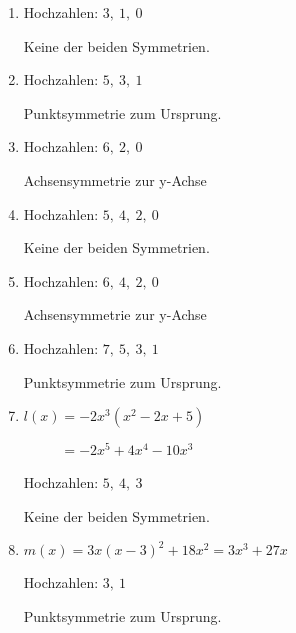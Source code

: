 \begin{Answer}[ref=ganzSymA1]
	
	\begin{minipage}{\textwidth}
		\begin{minipage}[t]{0.5\textwidth}
			\begin{enumerate}[label=\alph*)]
				\item Hochzahlen: \(3,\ 1,\ 0\)
				
				Keine der beiden Symmetrien.
				\item Hochzahlen: \(5,\ 3,\ 1\)
				
				Punktsymmetrie zum Ursprung.
				\item Hochzahlen: \(6,\ 2,\ 0\)
				
				Achsensymmetrie zur y-Achse
				\item Hochzahlen: \(5,\ 4,\ 2,\ 0\)
				
				Keine der beiden Symmetrien.
			\end{enumerate}
		\end{minipage}%
		\begin{minipage}[t]{0.5\textwidth}
			\begin{enumerate}[label=\alph*)]
				\setcounter{enumi}{4}
				\item Hochzahlen: \(6,\ 4,\ 2,\ 0\)
				
				Achsensymmetrie zur y-Achse
				\item Hochzahlen: \(7,\ 5,\ 3,\ 1\)
				
				Punktsymmetrie zum Ursprung.
				\item \(l(x)=-2x^3\left(x^2-2x+5\right)\)
				
				\(\phantom{l(x)}=-2x^5+4x^4-10x^3\)
				
				Hochzahlen: \(5,\ 4,\ 3\)
				
				Keine der beiden Symmetrien.
				\item \(m(x)=3x\left(x-3\right)^2+18x^2=3x^3+27x\)
				
				Hochzahlen: \(3,\ 1\)
				
				Punktsymmetrie zum Ursprung.
			\end{enumerate}
		\end{minipage}%
	\end{minipage}
\end{Answer}